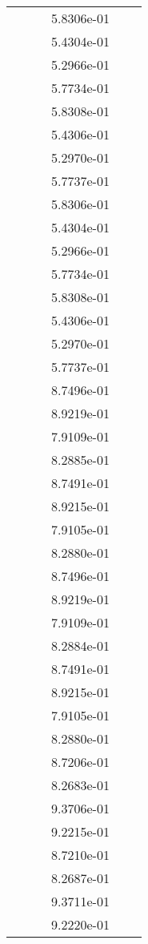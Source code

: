 \begin{xltabular}{\textwidth}{r|rS[table-format=1.3e+2]S[table-format=1.4e+2]S[table-format=1.4e+2]S[table-format=-1.5]}
&  &  & 5.8306e-01 & & \\
&  &  & 5.4304e-01 & & \\
&  &  & 5.2966e-01 & & \\
&  &  & 5.7734e-01 & & \\
&  &  & 5.8308e-01 & & \\
&  &  & 5.4306e-01 & & \\
&  &  & 5.2970e-01 & & \\
&  &  & 5.7737e-01 & & \\
&  &  & 5.8306e-01 & & \\
&  &  & 5.4304e-01 & & \\
&  &  & 5.2966e-01 & & \\
&  &  & 5.7734e-01 & & \\
&  &  & 5.8308e-01 & & \\
&  &  & 5.4306e-01 & & \\
&  &  & 5.2970e-01 & & \\
&  &  & 5.7737e-01 & & \\
&  &  & 8.7496e-01 & & \\
&  &  & 8.9219e-01 & & \\
&  &  & 7.9109e-01 & & \\
&  &  & 8.2885e-01 & & \\
&  &  & 8.7491e-01 & & \\
&  &  & 8.9215e-01 & & \\
&  &  & 7.9105e-01 & & \\
&  &  & 8.2880e-01 & & \\
&  &  & 8.7496e-01 & & \\
&  &  & 8.9219e-01 & & \\
&  &  & 7.9109e-01 & & \\
&  &  & 8.2884e-01 & & \\
&  &  & 8.7491e-01 & & \\
&  &  & 8.9215e-01 & & \\
&  &  & 7.9105e-01 & & \\
&  &  & 8.2880e-01 & & \\
&  &  & 8.7206e-01 & & \\
&  &  & 8.2683e-01 & & \\
&  &  & 9.3706e-01 & & \\
&  &  & 9.2215e-01 & & \\
&  &  & 8.7210e-01 & & \\
&  &  & 8.2687e-01 & & \\
&  &  & 9.3711e-01 & & \\
&  &  & 9.2220e-01 & & \\

\end{xltabular}
